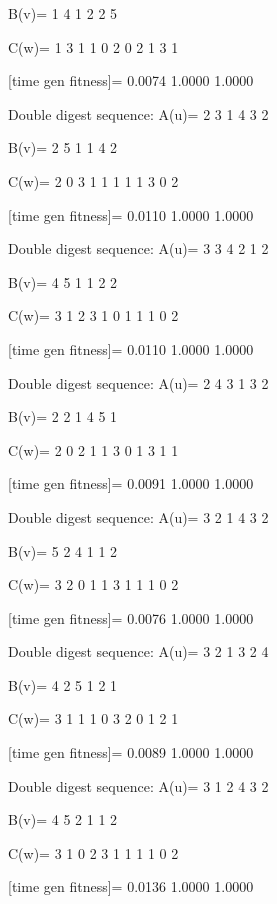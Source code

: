 B(v)=
     1     4     1     2     2     5

C(w)=
     1     3     1     1     0     2     0     2     1     3     1

[time gen fitness]=
    0.0074    1.0000    1.0000

Double digest sequence:
A(u)=
     2     3     1     4     3     2

B(v)=
     2     5     1     1     4     2

C(w)=
     2     0     3     1     1     1     1     1     3     0     2

[time gen fitness]=
    0.0110    1.0000    1.0000

Double digest sequence:
A(u)=
     3     3     4     2     1     2

B(v)=
     4     5     1     1     2     2

C(w)=
     3     1     2     3     1     0     1     1     1     0     2

[time gen fitness]=
    0.0110    1.0000    1.0000

Double digest sequence:
A(u)=
     2     4     3     1     3     2

B(v)=
     2     2     1     4     5     1

C(w)=
     2     0     2     1     1     3     0     1     3     1     1

[time gen fitness]=
    0.0091    1.0000    1.0000

Double digest sequence:
A(u)=
     3     2     1     4     3     2

B(v)=
     5     2     4     1     1     2

C(w)=
     3     2     0     1     1     3     1     1     1     0     2

[time gen fitness]=
    0.0076    1.0000    1.0000

Double digest sequence:
A(u)=
     3     2     1     3     2     4

B(v)=
     4     2     5     1     2     1

C(w)=
     3     1     1     1     0     3     2     0     1     2     1

[time gen fitness]=
    0.0089    1.0000    1.0000

Double digest sequence:
A(u)=
     3     1     2     4     3     2

B(v)=
     4     5     2     1     1     2

C(w)=
     3     1     0     2     3     1     1     1     1     0     2

[time gen fitness]=
    0.0136    1.0000    1.0000

